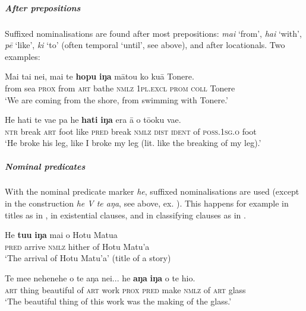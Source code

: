 \subparagraph{After prepositions} Suffixed nominalisations are found after most prepositions: \textit{mai} ‘from’, \textit{hai} ‘with’, \textit{pē} ‘like’, \textit{ki} ‘to’ (often temporal ‘until’, see above), and after locationals. Two examples:

\ea\label{ex:3.47}
\gll Mai tai nei, mai te \textbf{hopu} \textbf{iŋa} mātou ko kuā Tonere. \\
from sea \textsc{prox} from \textsc{art} bathe \textsc{nmlz} \textsc{1pl.excl} \textsc{prom} \textsc{coll} Tonere \\

\glt 
‘We are coming from the shore, from swimming with Tonere.’ \textstyleExampleref{[R245.084]} 
\z

\ea\label{ex:3.48}
\gll He hati te va{\ꞌ}e pa he \textbf{hati} \textbf{iŋa} era {\ꞌ}ā o tō{\ꞌ}oku va{\ꞌ}e.\\
\textsc{ntr} break \textsc{art} foot like \textsc{pred} break \textsc{nmlz} \textsc{dist} \textsc{ident} of \textsc{poss.1sg.o} foot\\

\glt 
‘He broke his leg, like I broke my leg (lit. like the breaking of my leg).’ \textstyleExampleref{[R492.021]} 
\z

\subparagraph{Nominal predicates} With the nominal predicate marker \textit{he}, suffixed nominalisations are used (except in the construction \textit{he V te aŋa}, see  above, ex. ). This happens for example in titles as in , in existential clauses, and in classifying clauses as in . 

\ea\label{ex:3.49}
\gll He \textbf{tu{\ꞌ}u} \textbf{iŋa} mai o Hotu Matu{\ꞌ}a\\
\textsc{pred} arrive \textsc{nmlz} hither of Hotu Matu’a\\

\glt 
‘The arrival of Hotu Matu’a’ (title of a story) \textstyleExampleref{[R369.000]} 
\z

\ea\label{ex:3.50}
\gll Te me{\ꞌ}e nehenehe o te aŋa nei... he \textbf{aŋa} \textbf{iŋa} o te hi{\ꞌ}o.\\
\textsc{art} thing beautiful of \textsc{art} work \textsc{prox} \textsc{pred} make \textsc{nmlz} of \textsc{art} glass\\

\glt 
‘The beautiful thing of this work was the making of the glass.’ \textstyleExampleref{[R360.038]} 
\z

